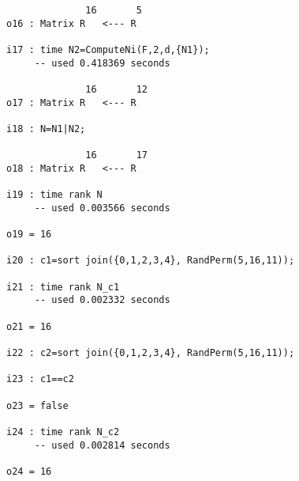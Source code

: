 \documentclass[fleqn,reqno]{amsart}
\numberwithin{first}{chapter}
\begin{document}
\begin{example}[$\mt{ex604}$]
\begin{verbatim}
              16       5
o16 : Matrix R   <--- R

i17 : time N2=ComputeNi(F,2,d,{N1});
     -- used 0.418369 seconds

              16       12
o17 : Matrix R   <--- R

i18 : N=N1|N2;

              16       17
o18 : Matrix R   <--- R

i19 : time rank N
     -- used 0.003566 seconds

o19 = 16

i20 : c1=sort join({0,1,2,3,4}, RandPerm(5,16,11));

i21 : time rank N_c1
     -- used 0.002332 seconds

o21 = 16

i22 : c2=sort join({0,1,2,3,4}, RandPerm(5,16,11));

i23 : c1==c2

o23 = false

i24 : time rank N_c2
     -- used 0.002814 seconds

o24 = 16
\end{verbatim}
\end{example}
\end{document}
